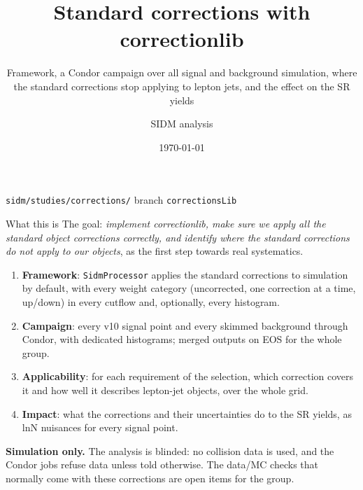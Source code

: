 \documentclass[aspectratio=169,11pt]{beamer}
\title{\textbf{Standard corrections with correctionlib}}
\subtitle{Framework, a Condor campaign over all signal and background simulation, where the standard corrections stop applying to lepton jets, and the effect on the SR yields}
\author{SIDM analysis}
\date{\today}
\newcommand{\code}[1]{{\small\colorbox{codebg}{\texttt{#1}}}}
\begin{document}
\begin{frame}
  \titlepage
  \begin{center}
    \small
    \code{sidm/studies/corrections/} \quad branch \code{correctionsLib}
  \end{center}
\end{frame}

\begin{frame}{What this is}
  The goal: \emph{implement correctionlib, make sure we apply all the standard object
  corrections correctly, and identify where the standard corrections do not apply to our
  objects}, as the first step towards real systematics.

  \vspace{0.1em}
  \small
  \begin{enumerate}
    \item \textbf{Framework}: \code{SidmProcessor} applies the standard corrections to
          simulation by default, with every weight category (uncorrected, one correction at
          a time, up/down) in every cutflow and, optionally, every histogram.
    \item \textbf{Campaign}: every v10 signal point and every skimmed background through Condor,
          with dedicated histograms; merged outputs on EOS for the whole group.
    \item \textbf{Applicability}: for each requirement of the selection, which correction covers
          it and how well it describes lepton-jet objects, over the whole grid.
    \item \textbf{Impact}: what the corrections and their uncertainties do to the SR yields,
          as lnN nuisances for every signal point.
  \end{enumerate}

  \vspace{0.2em}
  {\small\textcolor{accent}{\textbf{Simulation only.}} The analysis is blinded: no collision data
  is used, and the Condor jobs refuse data unless told otherwise. The data/MC checks that
  normally come with these corrections are open items for the group.}
\end{frame}
\end{document}

